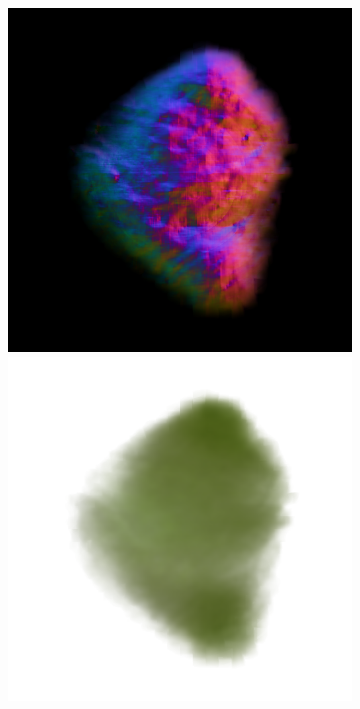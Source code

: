 \begin{figure}[ht]
\begin{subfigure}[b]{0.222\textwidth}
        \includegraphics[width=\textwidth]{figures/appendix/magic123_coarse_robot_left_0_part2.png}
        \includegraphics[width=\textwidth]{figures/appendix/magic123_coarse_robot_left_0_part1.png}

\end{subfigure}
\end{figure}
